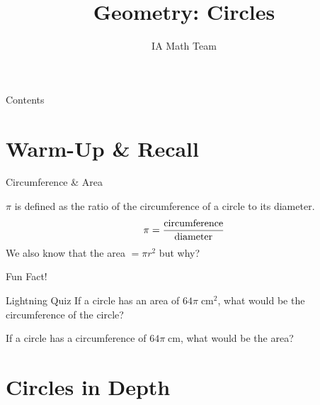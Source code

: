 \documentclass[aspectratio=169,xcolor=dvipsnames]{beamer}
\title[Quadrilaterals]{Geometry: Circles}
\author[IA Math Team]{IA Math Team}
\begin{document}
\begin{frame}[t]
  \titlepage
\end{frame}

\begin{frame}[t]{Contents}
  \tableofcontents
\end{frame}

\section{Warm-Up \& Recall}

\begin{frame}[t]{Circumference \& Area}
    \begin{definition}
    $\pi$ is defined as the ratio of the circumference of a circle to its diameter.
    \[
        \pi = \frac{\rm circumference}{\rm diameter}
    \]
    We also know that the area $=\pi r^2$ but why?
    \end{definition}
\end{frame}

\begin{frame}[t]{Fun Fact!}
    \vspace{2cm}
    \begin{center}
    \end{center}
\end{frame}
\begin{frame}[t]{Lightning Quiz}
    If a circle has an area of $64\pi \;\text{cm}^2$, what would be the circumference of the circle?
    
    \vspace{2cm}
    
    If a circle has a circumference of $64\pi \;\text{cm}$, what would be the area?
\end{frame}

\section{Circles in Depth}
\end{document}
